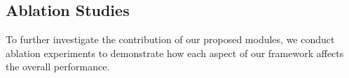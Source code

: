 \documentclass[sigconf]{acmart}
\begin{document}
\begin{table}[htbp]
\caption{Ablation study for the hyperparameters in the proposed modality-aware contrastive instance learning.}
\end{table}

\subsection{Ablation Studies}

To further investigate the contribution of our proposed modules, we conduct ablation experiments to demonstrate how each aspect of our framework affects the overall performance.
\end{document}
